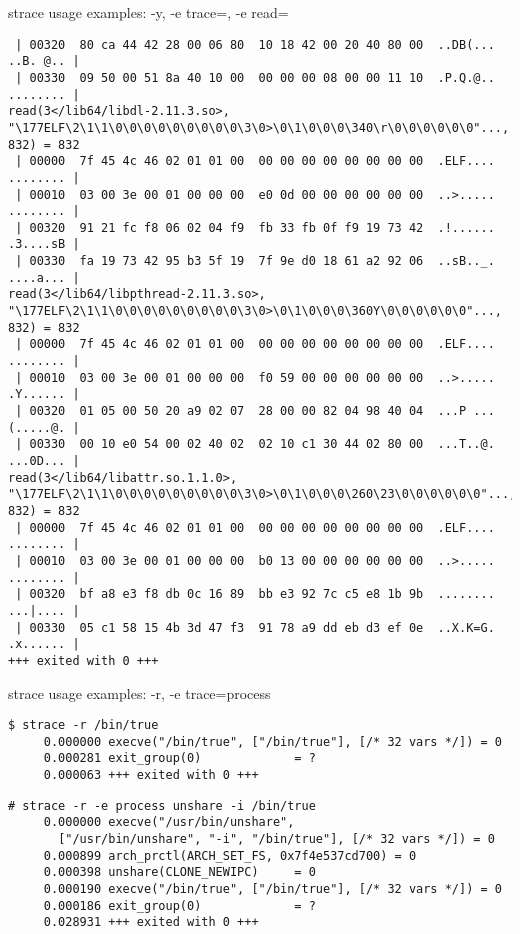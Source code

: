 \begin{frame}[fragile]{strace usage examples: -y, -e trace=, -e read=}
\begin{verbatim}
 | 00320  80 ca 44 42 28 00 06 80  10 18 42 00 20 40 80 00  ..DB(... ..B. @.. |
 | 00330  09 50 00 51 8a 40 10 00  00 00 00 08 00 00 11 10  .P.Q.@.. ........ |
read(3</lib64/libdl-2.11.3.so>, "\177ELF\2\1\1\0\0\0\0\0\0\0\0\0\3\0>\0\1\0\0\0\340\r\0\0\0\0\0\0"..., 832) = 832
 | 00000  7f 45 4c 46 02 01 01 00  00 00 00 00 00 00 00 00  .ELF.... ........ |
 | 00010  03 00 3e 00 01 00 00 00  e0 0d 00 00 00 00 00 00  ..>..... ........ |
 | 00320  91 21 fc f8 06 02 04 f9  fb 33 fb 0f f9 19 73 42  .!...... .3....sB |
 | 00330  fa 19 73 42 95 b3 5f 19  7f 9e d0 18 61 a2 92 06  ..sB.._. ....a... |
read(3</lib64/libpthread-2.11.3.so>, "\177ELF\2\1\1\0\0\0\0\0\0\0\0\0\3\0>\0\1\0\0\0\360Y\0\0\0\0\0\0"..., 832) = 832
 | 00000  7f 45 4c 46 02 01 01 00  00 00 00 00 00 00 00 00  .ELF.... ........ |
 | 00010  03 00 3e 00 01 00 00 00  f0 59 00 00 00 00 00 00  ..>..... .Y...... |
 | 00320  01 05 00 50 20 a9 02 07  28 00 00 82 04 98 40 04  ...P ... (.....@. |
 | 00330  00 10 e0 54 00 02 40 02  02 10 c1 30 44 02 80 00  ...T..@. ...0D... |
read(3</lib64/libattr.so.1.1.0>, "\177ELF\2\1\1\0\0\0\0\0\0\0\0\0\3\0>\0\1\0\0\0\260\23\0\0\0\0\0\0"..., 832) = 832
 | 00000  7f 45 4c 46 02 01 01 00  00 00 00 00 00 00 00 00  .ELF.... ........ |
 | 00010  03 00 3e 00 01 00 00 00  b0 13 00 00 00 00 00 00  ..>..... ........ |
 | 00320  bf a8 e3 f8 db 0c 16 89  bb e3 92 7c c5 e8 1b 9b  ........ ...|.... |
 | 00330  05 c1 58 15 4b 3d 47 f3  91 78 a9 dd eb d3 ef 0e  ..X.K=G. .x...... |
+++ exited with 0 +++
\end{verbatim}
\end{frame}

\begin{frame}[fragile]{strace usage examples: -r, -e trace=process}
\scriptsize
\begin{verbatim}
$ strace -r /bin/true
     0.000000 execve("/bin/true", ["/bin/true"], [/* 32 vars */]) = 0
     0.000281 exit_group(0)             = ?
     0.000063 +++ exited with 0 +++
\end{verbatim}

\begin{verbatim}
# strace -r -e process unshare -i /bin/true
     0.000000 execve("/usr/bin/unshare",
       ["/usr/bin/unshare", "-i", "/bin/true"], [/* 32 vars */]) = 0
     0.000899 arch_prctl(ARCH_SET_FS, 0x7f4e537cd700) = 0
     0.000398 unshare(CLONE_NEWIPC)     = 0
     0.000190 execve("/bin/true", ["/bin/true"], [/* 32 vars */]) = 0
     0.000186 exit_group(0)             = ?
     0.028931 +++ exited with 0 +++
\end{verbatim}
\end{frame}

